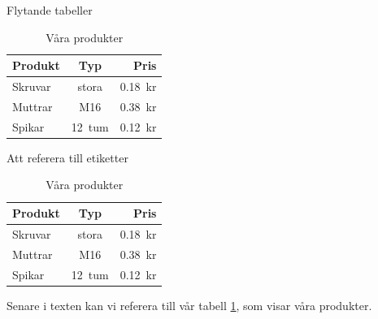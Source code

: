 \begin{Slide}{Flytande tabeller}\SlideFontSmall


  \noindent{}

  \begin{exlatex}
\begin{table}[t]
  \begin{tabular}{|l|c|r|}
    Produkt & Typ    & Pris    \\
    \hline
    Skruvar & stora  & 0.18~kr \\
    Muttrar & M16    & 0.38~kr \\
    Spikar  & 12~tum & 0.12~kr
  \end{tabular}
  \caption{Våra produkter}
\end{table}
  \end{exlatex}
\end{Slide}

\begin{Slide}{Att referera till etiketter}\SlideFontSmall
  \vspace{1em}


  \noindent{}

  \vspace{1em}
  \begin{exlatex}
\begin{table}
  \begin{tabular}{lcr}
    Produkt & Typ    & Pris    \\
    \hline
    Skruvar & stora  & 0.18~kr \\
    Muttrar & M16    & 0.38~kr \\
    Spikar  & 12~tum & 0.12~kr
  \end{tabular}
  \caption{Våra produkter}
  \label{produkter}
\end{table}
Senare i texten kan vi referera till vår tabell \ref{produkter}, som visar våra produkter.
  \end{exlatex}

\end{Slide}

